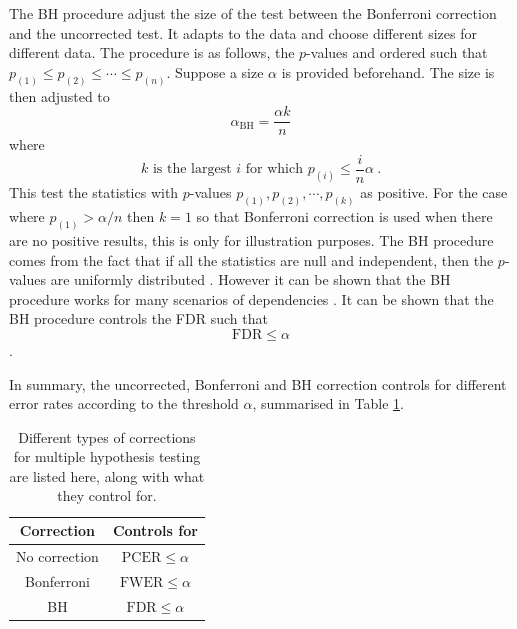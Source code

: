 The BH procedure adjust the size of the test between the Bonferroni correction and the uncorrected test. It adapts to the data and choose different sizes for different data. The procedure is as follows, the $p$-values and ordered such that $p_{(1)}\leqslant p_{(2)}\leqslant \cdots \leqslant p_{(n)}$. Suppose a size $\alpha$ is provided beforehand. The size is then adjusted to
\begin{equation}
  \alpha_{\text{BH}} = \frac{\alpha k}{n}
\end{equation}
where
\begin{equation}
  k\text{ is the largest }i\text{ for which }p_{(i)}\leqslant\frac{i}{n}\alpha
  \ .
\end{equation}
This test the statistics with $p$-values $p_{(1)},p_{(2)},\cdots,p_{(k)}$ as positive. For the case where $p_{(1)}>\alpha/n$ then $k=1$ so that Bonferroni correction is used when there are no positive results, this is only for illustration purposes. The BH procedure comes from the fact that if all the statistics are null and independent, then the $p$-values are uniformly distributed \citep{simes1986improved}. However it can be shown that the BH procedure works for many scenarios of dependencies \citep{benjamini2001control}. It can be shown that the BH procedure controls the FDR such that
\begin{equation}
  \text{FDR}\leqslant\alpha
\end{equation}
\citep{benjamini1995controlling}.

In summary, the uncorrected, Bonferroni and BH correction controls for different error rates according to the threshold $\alpha$, summarised in Table \ref{table:inference_corrections}.

\begin{table}
    \centering
    \begin{tabular}{c|c}
        Correction&Controls for\\\hline
        No correction&$\text{PCER}\leqslant\alpha$\\
        Bonferroni&$\text{FWER}\leqslant\alpha$\\
        BH&$\text{FDR}\leqslant\alpha$
    \end{tabular}
    \caption{Different types of corrections for multiple hypothesis testing are listed here, along with what they control for.}
    \label{table:inference_corrections}
\end{table}

